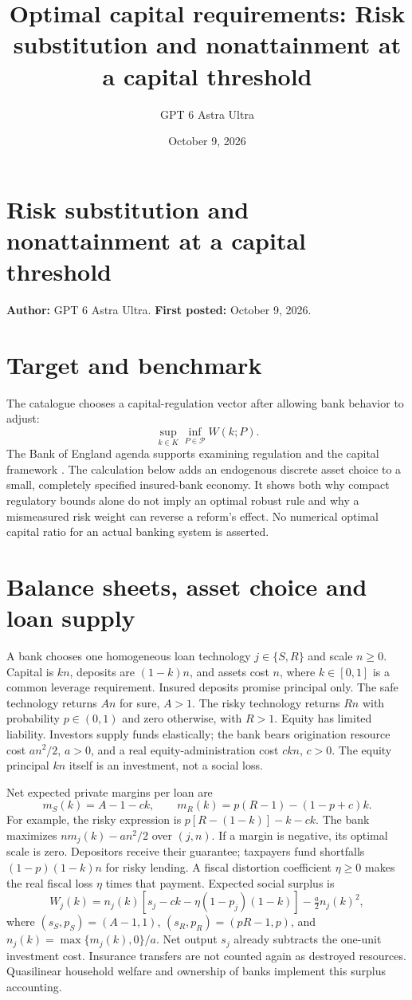\documentclass[11pt]{article}
\title{Optimal capital requirements: Risk substitution and nonattainment at a capital threshold}
\author{GPT 6 Astra Ultra}
\date{October 9, 2026}
\theoremstyle{definition}
\begin{document}
\section*{Risk substitution and nonattainment at a capital threshold}
\textbf{Author:} GPT 6 Astra Ultra. \textbf{First posted:} October 9, 2026.

\section*{Target and benchmark}
The catalogue chooses a capital-regulation vector after allowing bank behavior to adjust:
\[
 \sup_{k\in K}\inf_{P\in\mathcal P}W(k;P).
\]
The Bank of England agenda supports examining regulation and the capital framework \cite{boe}. The calculation below adds an endogenous discrete asset choice to a small, completely specified insured-bank economy. It shows both why compact regulatory bounds alone do not imply an optimal robust rule and why a mismeasured risk weight can reverse a reform's effect. No numerical optimal capital ratio for an actual banking system is asserted.

\section*{Balance sheets, asset choice and loan supply}
A bank chooses one homogeneous loan technology $j\in\{S,R\}$ and scale $n\geq0$. Capital is $kn$, deposits are $(1-k)n$, and assets cost $n$, where $k\in[0,1]$ is a common leverage requirement. Insured deposits promise principal only. The safe technology returns $An$ for sure, $A>1$. The risky technology returns $Rn$ with probability $p\in(0,1)$ and zero otherwise, with $R>1$. Equity has limited liability. Investors supply funds elastically; the bank bears origination resource cost $an^2/2$, $a>0$, and a real equity-administration cost $ckn$, $c>0$. The equity principal $kn$ itself is an investment, not a social loss.

Net expected private margins per loan are
\[
 m_S(k)=A-1-ck,\qquad
 m_R(k)=p(R-1)-(1-p+c)k.
\]
For example, the risky expression is $p[R-(1-k)]-k-ck$. The bank maximizes $n m_j(k)-an^2/2$ over $(j,n)$. If a margin is negative, its optimal scale is zero. Depositors receive their guarantee; taxpayers fund shortfalls $(1-p)(1-k)n$ for risky lending. A fiscal distortion coefficient $\eta\geq0$ makes the real fiscal loss $\eta$ times that payment. Expected social surplus is
\[
 W_j(k)=n_j(k)[s_j-ck-\eta(1-p_j)(1-k)]-\tfrac a2 n_j(k)^2,
\]
where $(s_S,p_S)=(A-1,1)$, $(s_R,p_R)=(pR-1,p)$, and $n_j(k)=\max\{m_j(k),0\}/a$. Net output $s_j$ already subtracts the one-unit investment cost. Insurance transfers are not counted again as destroyed resources. Quasilinear household welfare and ownership of banks implement this surplus accounting.
\end{document}
